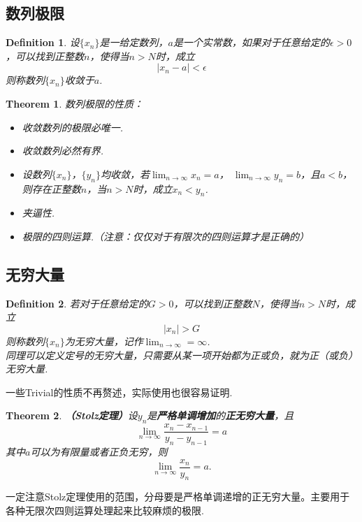 \documentclass[9pt]{ctexart}
\newtheorem{definition}{Definition}[section]
\newtheorem{theorem}{Theorem}[section]
\begin{document}
\subsection{数列极限}
\begin{definition}
    设$\{x_n\}$是一给定数列，$a$是一个实常数，如果对于任意给定的$\epsilon>0$，可以找到正整数$n$，使得当$n>N$时，成立
    \[|x_n-a|<\epsilon\]
    则称数列$\{x_n\}$收敛于$a$.
\end{definition}

\begin{theorem}
    数列极限的性质：
    \begin{itemize}
        \item[（1）] 收敛数列的极限必唯一.
        \item[（2）] 收敛数列必然有界.
        \item[（3）] 设数列$\{x_n\}$，$\{y_n\}$均收敛，若$\lim_{n\to\infty}x_n=a$， $\lim_{n\to\infty}y_n=b$，且$a<b$，则存在正整数$n$，当$n>N$时，成立$x_n<y_n$.
        \item[（4）] 夹逼性.
        \item[（5）] 极限的四则运算.（注意：仅仅对于有限次的四则运算才是正确的）
    \end{itemize}
\end{theorem}
\subsection{无穷大量}
\begin{definition}
    若对于任意给定的$G>0$，可以找到正整数$N$，使得当$n>N$时，成立
    \[|x_n|>G\]
    则称数列$\{x_n\}$为无穷大量，记作$\lim_{n\to\infty}=\infty$.\\
    同理可以定义定号的无穷大量，只需要从某一项开始都为正或负，就为正（或负）无穷大量.
\end{definition}
\par{一些Trivial的性质不再赘述，实际使用也很容易证明.}
\begin{theorem}
    \textbf{（Stolz定理）}设$y_n$是\textbf{严格单调增加}的\textbf{正无穷大量}，且
    \[\lim_{n\to\infty}\frac{x_n-x_{n-1}}{y_n-y_{n-1}}=a\]
    其中$a$可以为有限量或者正负无穷，则
    \[\lim_{n\to\infty}\frac{x_n}{y_n}=a.\]
\end{theorem}

\par{一定注意Stolz定理使用的范围，分母要是严格单调递增的正无穷大量。主要用于各种无限次四则运算处理起来比较麻烦的极限.}
\end{document}
